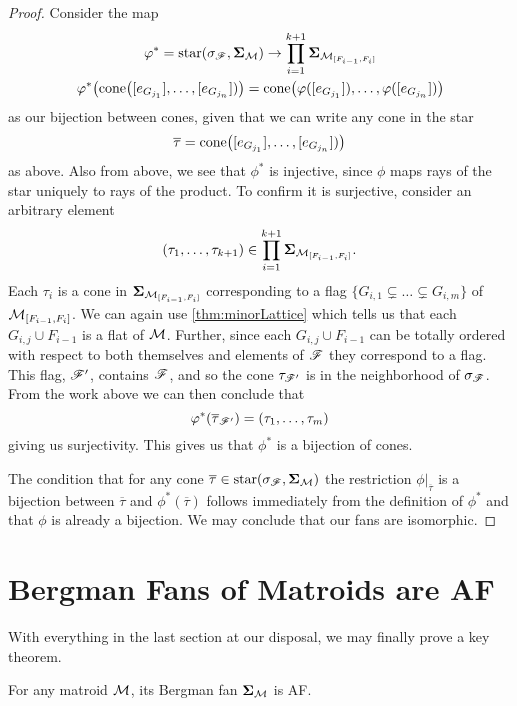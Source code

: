 \documentclass[12pt,oneside]{../../sfsuthesis}
\begin{document}
\begin{proof}
    Consider the map
    \begin{gather*}
        \varphi^\ast = \operatorname{star}(\sigma_{\mathscr{F}}, {\bm{\Sigma}}_{\mathcal{M}}) \to \prod_{i=1}^{k+1} {\bm{\Sigma}}_{\mathcal{M}_{[F_{i-1}, F_i]}} \\
        \varphi^\ast\big(\mathrm{cone}\big([e_{G_{j_1}}], \dots,  [e_{G_{j_n}}])\big) = \mathrm{cone}\big( \varphi([e_{G_{j_1}}]), \dots,  \varphi([e_{G_{j_n}}])\big)
    \end{gather*}
    as our bijection between cones, given that we can write any cone in the star
    \[ \overline{\tau}  = \mathrm{cone}\big([e_{G_{j_1}}], \dots,  [e_{G_{j_n}}])\big) \]
    as above.
    Also from above, we see that \( \phi^\ast \) is injective, since \( \phi \) maps rays of the star uniquely to rays of the product.
    To confirm it is surjective, consider an arbitrary element
    \[
        (\tau_1, \dots, \tau_{k+1}) \in \prod_{i=1}^{k+1} {\bm{\Sigma}}_{\mathcal{M}_{[F_{i-1}, F_i]}}.
    \]
    Each \( \tau_i \) is a cone in \( {\bm{\Sigma}}_{\mathcal{M}_{[F_{i-1}, F_i]}} \) corresponding to a flag \( \{ G_{i,1} \subsetneq \dots \subsetneq G_{i,m} \} \) of \( \mathcal{M}_{[F_{i-1}, F_i]} \).
    We can again use \th\ref{thm:minorLattice} which tells us that each \( G_{i,j} \cup F_{i-1} \) is a flat of \( \mathcal{M} \).
    Further, since each \( G_{i, j} \cup F_{i-1} \) can be totally ordered with respect to both themselves and elements of \( \mathscr{F} \) they correspond to a flag.
    This flag, \( \mathscr{F}' \), contains \( \mathscr{F} \), and so the cone \( \tau_{\mathscr{F}'} \) is in the neighborhood of \( \sigma_{\mathscr{F}} \).
    From the work above we can then conclude that
    \[
        \varphi^\ast(\overline{\tau}_{\mathscr{F}'}) = (\tau_1, \dots, \tau_m)
    \]
    giving us surjectivity.
    This gives us that \( \phi^\ast \) is a bijection of cones.

    The condition that for any cone \( \overline{\tau} \in \operatorname{star}(\sigma_{\mathscr{F}}, {\bm{\Sigma}}_{\mathcal{M}}) \) the restriction \( \phi|_{\overline{\tau}} \) is a bijection between \( \overline{\tau} \) and \( \phi^\ast(\overline{\tau}) \) follows immediately from the definition of \( \phi^\ast \) and that \( \phi \) is already a bijection.
    We may conclude that our fans are isomorphic.
\end{proof}

\section{Bergman Fans of Matroids are AF}

With everything in the last section at our disposal, we may finally prove a key theorem.
\begin{theorem}\th\label{thm:matroidAF}
    For any matroid \( \mathcal{M} \), its Bergman fan \( {\bm{\Sigma}}_{\mathcal{M}} \) is AF.
\end{theorem}
\end{document}
